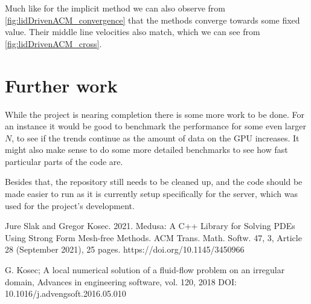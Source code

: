 \documentclass{article}
\begin{document}
Much like for the implicit method we can also observe from \ref{fig:lidDrivenACM_convergence} that 
the methods converge towards some fixed value. Their middle line velocities also match, which we can 
see from \ref{fig:lidDrivenACM_cross}.

\section{Further work}
While the project is nearing completion there is some more work to be done. For an instance it 
would be good to benchmark the performance for some even larger \(N\), to see if the trends continue
as the amount of data on the GPU increases. It might also make sense to do some more detailed 
benchmarks to see how fast particular parts of the code are.

Besides that, the repository still needs to be cleaned up, and the code should be made easier to run
as it is currently setup specifically for the server, which was used for the project's development. 
\begin{thebibliography}{99}
     Jure Slak and Gregor Kosec. 2021. Medusa: A C++ Library
    for Solving PDEs Using Strong Form Mesh-free Methods. ACM Trans. Math. Softw. 47,
    3, Article 28 (September 2021), 25 pages. https://doi.org/10.1145/3450966

     G. Kosec; A local numerical solution of a fluid-flow problem
    on an irregular domain, Advances in engineering software, vol. 120, 2018
    DOI: 10.1016/j.advengsoft.2016.05.010
\end{thebibliography}
\end{document}
